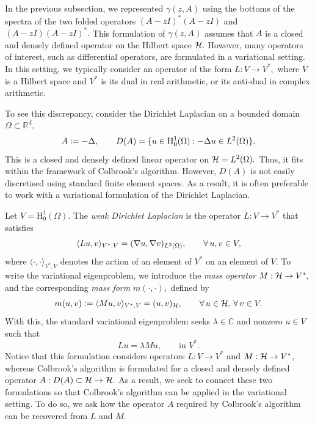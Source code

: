 In the previous subsection, we represented $\gamma(z, A)$ using the bottoms of the spectra of the two folded operators $(A-zI)^*(A-zI)$ and $(A-zI)(A-zI)^*.$ This formulation of $\gamma(z, A)$ assumes that $A$ is a closed and densely defined operator on the Hilbert space $\mathcal{H}.$ However, many operators of interest, such as differential operators, are formulated in a variational setting. In this setting, we typically consider an operator of the form  $L: V \rightarrow V^*,$ where $V$ is a Hilbert space and $V^*$ is its dual in real arithmetic, or its anti-dual in complex arithmetic.




To see this discrepancy, consider the Dirichlet Laplacian on a bounded domain  $\Omega \subset \mathbb{R}^d,$ 
\begin{equation} \label{strong L}
    A \vcentcolon= -\Delta, \qquad D(A) = \{u \in \mathrm{H}_0^1(\Omega) : -\Delta u \in L^2(\Omega)\}.
\end{equation}
This is a closed and densely defined linear operator on $\mathcal{H} = L^2(\Omega).$ Thus, it fits within the framework of Colbrook's algorithm. However, $D(A)$ is not easily discretised using standard finite element spaces. As a result, it is often preferable to work with a variational formulation of the Dirichlet Laplacian.


Let $V =\text{H}_0^1(\Omega).$ The \textit{weak Dirichlet Laplacian} is the operator $L: V \rightarrow V^*$ that satisfies
\begin{equation} \label{weak L}
    \langle Lu, v \rangle_{V^*, V} = (\nabla u, \nabla v)_{L^2(\Omega)}, \qquad \operatorname{\forall} u, v \in V,
\end{equation}
where $\langle \cdot, \cdot \rangle_{V^*, V}$ denotes the action of an element of $V^*$ on an element of $V.$ To write the variational eigenproblem, we introduce the \textit{mass operator} $M: \mathcal{H} \rightarrow V^*\!$, and the corresponding \textit{mass form} $m(\cdot, \cdot),$ defined by
\begin{equation}
    m(u,v) \vcentcolon= \langle Mu, v \rangle_{V^*, V} = (u, v)_{\mathcal{H}}, \qquad \operatorname{\forall} u \in \mathcal{H},  \, \operatorname{\forall} v \in V.
\end{equation}
With this, the standard variational eigenproblem seeks $\lambda \in \mathbb{C}$ and nonzero $u \in V$ such that
\begin{equation}
    Lu = \lambda M u, \qquad \text{in } V^*\!.
\end{equation}
Notice that this formulation considers operators $L: V \rightarrow V^*$ and $M: \mathcal{H} \rightarrow V^*$, whereas Colbrook's algorithm is formulated for a closed and densely defined operator $A : D(A) \subset \mathcal{H} \rightarrow \mathcal{H}.$ As a result, we seek to connect these two formulations so that Colbrook's algorithm can be applied in the variational setting. To do so, we ask how the operator $A$ required by Colbrook's algorithm can be recovered from $L$ and $M.$

